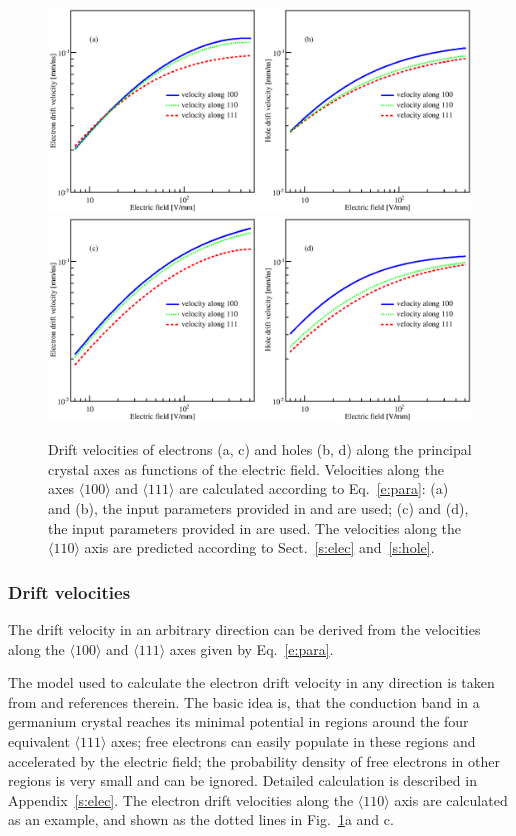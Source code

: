 \documentclass[epj]{svjour}
\begin{document}
\begin{figure}[tb]
\centering
\includegraphics[width=0.8\linewidth]{VvsElucian} 
\includegraphics[width=0.8\linewidth]{VvsEbart} 
\caption{Drift velocities of electrons (a, c) and holes (b, d) along
the principal crystal axes as functions of the electric
field. Velocities along the axes $\langle 100 \rangle$ and $\langle
111 \rangle$ are calculated according to Eq.~\ref{e:para}: (a) and
(b), the input parameters provided in \cite{miha} and \cite{reg} are
used; (c) and (d), the input parameters provided in \cite{bart} are
used. The velocities along the $\langle 110 \rangle$ axis are
predicted according to Sect.~\ref{s:elec} and~\ref{s:hole}.}
\label{f:vvse} 
\end{figure} 

\subsubsection{Drift velocities}
\label{s:vel}
The drift velocity in an arbitrary direction can be derived from the
velocities along the $\langle 100 \rangle$ and $\langle 111 \rangle$
axes given by Eq.~\ref{e:para}.

The model used to calculate the electron drift velocity in any
direction is taken from \cite{miha} and references therein. The basic
idea is, that the conduction band in a germanium crystal reaches its
minimal potential in regions around the four equivalent $\langle 111
\rangle$ axes; free electrons can easily populate in these regions and
accelerated by the electric field; the probability density of free
electrons in other regions is very small and can be ignored. Detailed
calculation is described in Appendix~\ref{s:elec}. The electron drift
velocities along the $\langle 110 \rangle$ axis are calculated as an
example, and shown as the dotted lines in Fig.~\ref{f:vvse}a and c.
\end{document}
